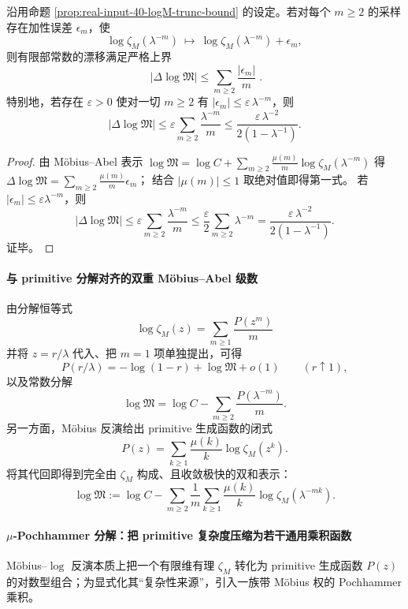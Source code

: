 \begin{proposition}\label{prop:real-input-40-logM-stability-functional}
沿用命题 \ref{prop:real-input-40-logM-trunc-bound} 的设定。若对每个 \(m\ge 2\) 的采样存在加性误差 \(\epsilon_m\)，使
\[
\log\zeta_M(\lambda^{-m})\ \longmapsto\ \log\zeta_M(\lambda^{-m})+\epsilon_m,
\]
则有限部常数的漂移满足严格上界
\[
\boxed{\;
|\Delta\log\mathfrak{M}|\le \sum_{m\ge 2}\frac{|\epsilon_m|}{m}\; }.
\]
特别地，若存在 \(\varepsilon>0\) 使对一切 \(m\ge 2\) 有 \(|\epsilon_m|\le \varepsilon\,\lambda^{-m}\)，则
\[
|\Delta\log\mathfrak{M}|
\le
\varepsilon\sum_{m\ge 2}\frac{\lambda^{-m}}{m}
\le
\frac{\varepsilon\,\lambda^{-2}}{2(1-\lambda^{-1})}.
\]
\end{proposition}
\begin{proof}
由 Möbius--Abel 表示 \(\log\mathfrak{M}=\log C+\sum_{m\ge 2}\frac{\mu(m)}{m}\log\zeta_M(\lambda^{-m})\) 得
\(
\Delta\log\mathfrak{M}=\sum_{m\ge 2}\frac{\mu(m)}{m}\epsilon_m
\)；
结合 \(|\mu(m)|\le 1\) 取绝对值即得第一式。
若 \(|\epsilon_m|\le \varepsilon\lambda^{-m}\)，则
\[
|\Delta\log\mathfrak{M}|
\le \varepsilon\sum_{m\ge 2}\frac{\lambda^{-m}}{m}
\le \frac{\varepsilon}{2}\sum_{m\ge 2}\lambda^{-m}
=\frac{\varepsilon\,\lambda^{-2}}{2(1-\lambda^{-1})}.
\]
证毕。
\end{proof}

\paragraph{与 primitive 分解对齐的双重 Möbius--Abel 级数}
由分解恒等式
\[
\log\zeta_M(z)=\sum_{m\ge 1}\frac{P(z^m)}{m}
\]
并将 $z=r/\lambda$ 代入、把 $m=1$ 项单独提出，可得
\[
P(r/\lambda)=-\log(1-r)+\log\mathfrak{M}+o(1)\qquad(r\uparrow 1),
\]
以及常数分解
\[
\log\mathfrak{M}=\log C-\sum_{m\ge 2}\frac{P(\lambda^{-m})}{m}.
\]
另一方面，Möbius 反演给出 primitive 生成函数的闭式
\[
P(z)=\sum_{k\ge 1}\frac{\mu(k)}{k}\log\zeta_M(z^k).
\]
将其代回即得到完全由 $\zeta_M$ 构成、且收敛极快的双和表示：
\[
\log\mathfrak{M}
:=\log C-\sum_{m\ge 2}\frac{1}{m}\sum_{k\ge 1}\frac{\mu(k)}{k}\log\zeta_M(\lambda^{-mk}).
\]

\paragraph{\texorpdfstring{$\mu$}{mu}-Pochhammer 分解：把 primitive 复杂度压缩为若干通用乘积函数}
Möbius--$\log$ 反演本质上把一个有限维有理 \(\zeta_M\) 转化为 primitive 生成函数 \(P(z)\) 的对数型组合；为显式化其“复杂性来源”，引入一族带 Möbius 权的 Pochhammer 乘积。

